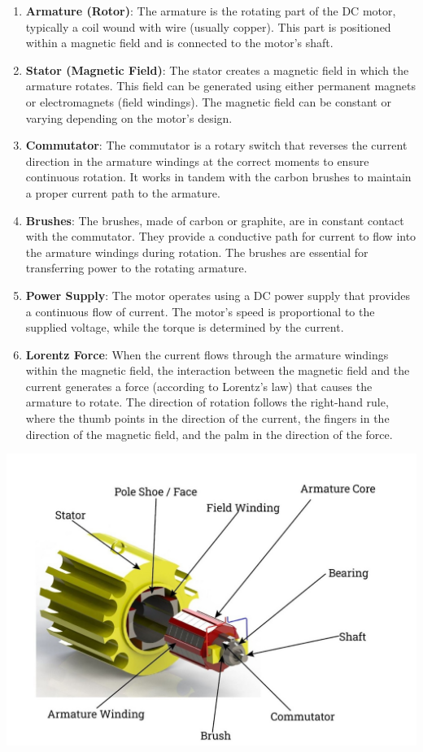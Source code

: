 \documentclass{article}
\begin{document}
\begin{enumerate}
    \item \textbf{Armature (Rotor)}: The armature is the rotating part of the DC motor, typically a coil wound with wire (usually copper). This part is positioned within a magnetic field and is connected to the motor's shaft.
    
    \item \textbf{Stator (Magnetic Field)}: The stator creates a magnetic field in which the armature rotates. This field can be generated using either permanent magnets or electromagnets (field windings). The magnetic field can be constant or varying depending on the motor's design.
    
    \item \textbf{Commutator}: The commutator is a rotary switch that reverses the current direction in the armature windings at the correct moments to ensure continuous rotation. It works in tandem with the carbon brushes to maintain a proper current path to the armature.
    
    \item \textbf{Brushes}: The brushes, made of carbon or graphite, are in constant contact with the commutator. They provide a conductive path for current to flow into the armature windings during rotation. The brushes are essential for transferring power to the rotating armature.
    
    \item \textbf{Power Supply}: The motor operates using a DC power supply that provides a continuous flow of current. The motor's speed is proportional to the supplied voltage, while the torque is determined by the current.
    
    \item \textbf{Lorentz Force}: When the current flows through the armature windings within the magnetic field, the interaction between the magnetic field and the current generates a force (according to Lorentz’s law) that causes the armature to rotate. The direction of rotation follows the right-hand rule, where the thumb points in the direction of the current, the fingers in the direction of the magnetic field, and the palm in the direction of the force.
\end{enumerate}

  \includegraphics[width=.7
    \linewidth]{photos/dc-motor-diagram.jpg}
    
\end{document}
